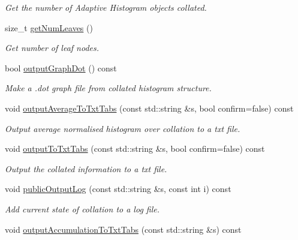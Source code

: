 \begin{DoxyCompactItemize}
\begin{DoxyCompactList}\small\item\em \-Get the number of \-Adaptive \-Histogram objects collated. \end{DoxyCompactList}\item 
size\-\_\-t \hyperlink{classsubpavings_1_1AdaptiveHistogramCollator_a421a5769038047a2a9867235e8fd95a1}{get\-Num\-Leaves} ()
\begin{DoxyCompactList}\small\item\em \-Get number of leaf nodes. \end{DoxyCompactList}\item 
bool \hyperlink{classsubpavings_1_1AdaptiveHistogramCollator_a130fc9b9b02214769aece5969de0d8fc}{output\-Graph\-Dot} () const 
\begin{DoxyCompactList}\small\item\em \-Make a .dot graph file from collated histogram structure. \end{DoxyCompactList}\item 
void \hyperlink{classsubpavings_1_1AdaptiveHistogramCollator_a514f2ebc1857e531b629f0ff3508b04b}{output\-Average\-To\-Txt\-Tabs} (const std\-::string \&s, bool confirm=false) const 
\begin{DoxyCompactList}\small\item\em \-Output average normalised histogram over collation to a txt file. \end{DoxyCompactList}\item 
void \hyperlink{classsubpavings_1_1AdaptiveHistogramCollator_aab47793e8362245a28a7ec3090da5352}{output\-To\-Txt\-Tabs} (const std\-::string \&s, bool confirm=false) const 
\begin{DoxyCompactList}\small\item\em \-Output the collated information to a txt file. \end{DoxyCompactList}\item 
void \hyperlink{classsubpavings_1_1AdaptiveHistogramCollator_aa477e8c6da033d93b212076630d3eec0}{public\-Output\-Log} (const std\-::string \&s, const int i) const 
\begin{DoxyCompactList}\small\item\em \-Add current state of collation to a log file. \end{DoxyCompactList}\item 
void \hyperlink{classsubpavings_1_1AdaptiveHistogramCollator_a4fab24a598b5d30ff259e71d29e2aebd}{output\-Accumulation\-To\-Txt\-Tabs} (const std\-::string \&s) const 

\end{DoxyCompactItemize}
